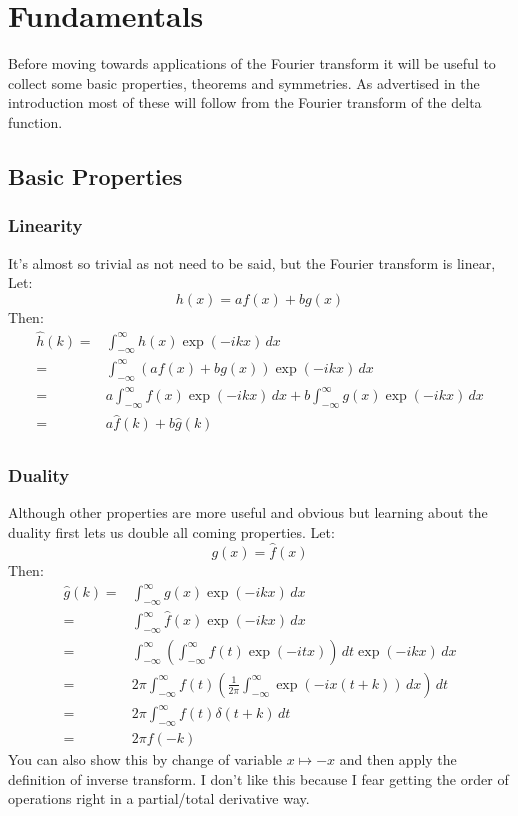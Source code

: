\chapter{Fundamentals}

Before moving towards applications of the Fourier transform it will be useful to collect some basic properties, theorems and symmetries.
As advertised in the introduction most of these will follow from the Fourier transform of the delta function.
\section{Basic Properties}
\subsection{Linearity}
It's almost so trivial as not need to be said, but the Fourier transform is linear,
Let:
\[h(x)=af(x)+bg(x)\]
Then:
\begin{equation*}
\begin{aligned}
\hat{h}(k) =& \int_{-\infty}^{\infty}h(x)\exp(-ikx)\,dx \\
=& \int_{-\infty}^{\infty}(af(x)+bg(x))\exp(-ikx)\,dx \\
=& a\int_{-\infty}^{\infty}f(x)\exp(-ikx)\,dx +b\int_{-\infty}^{\infty}g(x)\exp(-ikx)\,dx \\
=& a\hat{f}(k)+b\hat{g}(k) \\
\end{aligned}
\end{equation*}

\subsection{Duality}
Although other properties are more useful and obvious but learning about the duality first lets us double all coming properties.
Let:
\[g(x) = \hat{f}(x)\]
Then:
\begin{equation*}
\begin{aligned}
\hat{g}(k) =&\int_{-\infty}^{\infty}g(x)\exp(-ikx)\,dx \\
=&\int_{-\infty}^{\infty}\hat{f}(x)\exp(-ikx)\,dx \\
=& \int_{-\infty}^{\infty}\left(\int_{-\infty}^{\infty}f(t)\exp(-itx)\right)\,dt\exp(-ikx)\,dx \\
=& 2\pi\int_{-\infty}^{\infty} f(t) \left(\frac{1}{2\pi} \int_{-\infty}^{\infty} \exp(-ix(t+k))\,dx\right)\,dt \\
=& 2\pi\int_{-\infty}^{\infty} f(t) \delta(t+k)\,dt \\
=& 2\pi f(-k)
\end{aligned}
\end{equation*}
You can also show this by change of variable $x\mapsto -x$ and then apply the definition of inverse transform.
I don't like this because I fear getting the order of operations right in a partial/total derivative way.

